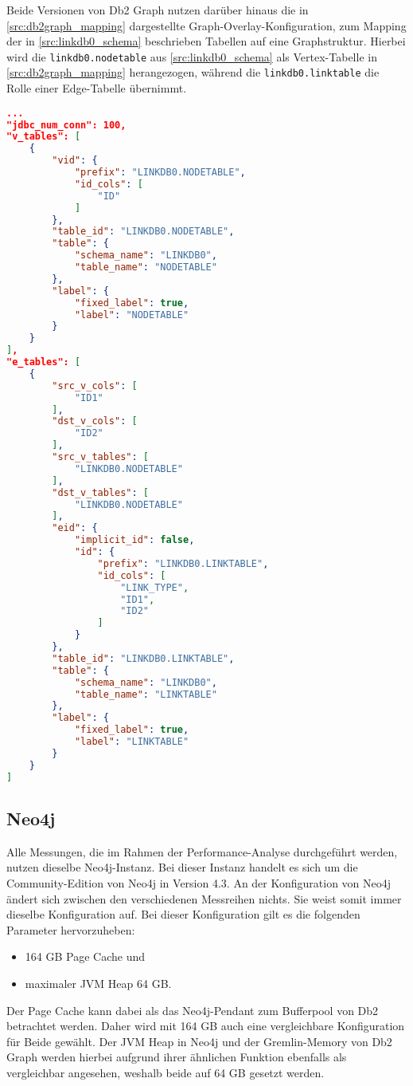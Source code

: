Beide Versionen von Db2 Graph nutzen darüber hinaus die in \autoref{src:db2graph_mapping} dargestellte Graph-Overlay-Konfiguration, zum Mapping der in \autoref{src:linkdb0_schema} beschrieben Tabellen auf eine Graphstruktur. Hierbei wird die \texttt{linkdb0.nodetable} aus \autoref{src:linkdb0_schema} als Vertex-Tabelle in \autoref{src:db2graph_mapping} herangezogen, während die \texttt{linkdb0.linktable} die Rolle einer Edge-Tabelle übernimmt. 
\begin{lstlisting}[label=src:db2graph_mapping,caption={Graph-Overlay-Konfiguration Db2 Graph},language=json]
...
"jdbc_num_conn": 100,
"v_tables": [
    {
        "vid": {
            "prefix": "LINKDB0.NODETABLE",
            "id_cols": [
                "ID"
            ]
        },
        "table_id": "LINKDB0.NODETABLE",
        "table": {
            "schema_name": "LINKDB0",
            "table_name": "NODETABLE"
        },
        "label": {
            "fixed_label": true,
            "label": "NODETABLE"
        }
    }
],
"e_tables": [
    {
        "src_v_cols": [
            "ID1"
        ],
        "dst_v_cols": [
            "ID2"
        ],
        "src_v_tables": [
            "LINKDB0.NODETABLE"
        ],
        "dst_v_tables": [
            "LINKDB0.NODETABLE"
        ],
        "eid": {
            "implicit_id": false,
            "id": {
                "prefix": "LINKDB0.LINKTABLE",
                "id_cols": [
                    "LINK_TYPE",
                    "ID1",
                    "ID2"
                ]
            }
        },
        "table_id": "LINKDB0.LINKTABLE",
        "table": {
            "schema_name": "LINKDB0",
            "table_name": "LINKTABLE"
        },
        "label": {
            "fixed_label": true,
            "label": "LINKTABLE"
        }
    }
]
\end{lstlisting}

\subsection{Neo4j}
Alle Messungen, die im Rahmen der Performance-Analyse durchgeführt werden, nutzen dieselbe Neo4j-Instanz. Bei dieser Instanz handelt es sich um die Community-Edition von Neo4j in Version 4.3. An der Konfiguration von Neo4j ändert sich zwischen den verschiedenen Messreihen nichts. Sie weist somit immer dieselbe Konfiguration auf. Bei dieser Konfiguration gilt es die folgenden Parameter hervorzuheben: 
\begin{itemize}
    \item 164 GB Page Cache und
    \item maximaler JVM Heap 64 GB.
\end{itemize}
Der Page Cache kann dabei als das Neo4j-Pendant zum Bufferpool von Db2 betrachtet werden. Daher wird mit 164 GB auch eine vergleichbare Konfiguration für Beide gewählt. Der JVM Heap in Neo4j und der Gremlin-Memory von Db2 Graph werden hierbei aufgrund ihrer ähnlichen Funktion ebenfalls als vergleichbar angesehen, weshalb beide auf 64 GB gesetzt werden.

